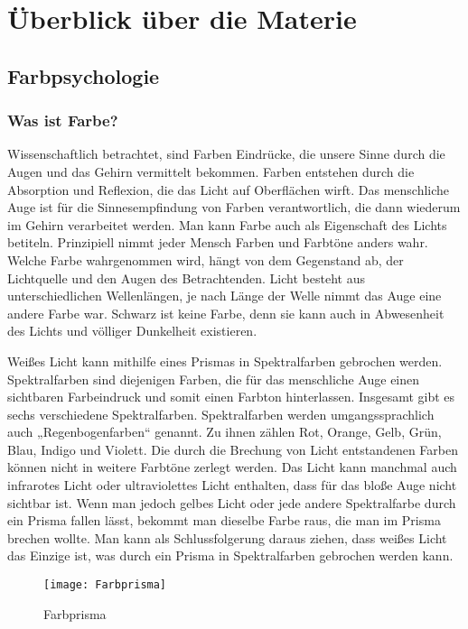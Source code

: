 \chapter{Überblick über die Materie}

\section{Farbpsychologie}

\subsection{Was ist Farbe?}
Wissenschaftlich betrachtet, sind Farben Eindrücke, die unsere Sinne durch die Augen und das Gehirn vermittelt bekommen. Farben entstehen durch die Absorption und Reflexion, die das Licht auf Oberflächen wirft. Das menschliche Auge ist für die Sinnesempfindung von Farben verantwortlich, die dann wiederum im Gehirn verarbeitet werden. Man kann Farbe auch als Eigenschaft des Lichts betiteln. Prinzipiell nimmt jeder Mensch Farben und Farbtöne anders wahr. Welche Farbe wahrgenommen wird, hängt von dem Gegenstand ab, der Lichtquelle und den Augen des Betrachtenden. Licht besteht aus unterschiedlichen Wellenlängen, je nach Länge der Welle nimmt das Auge eine andere Farbe war. Schwarz ist keine Farbe, denn sie kann auch in Abwesenheit des Lichts und völliger Dunkelheit existieren.
\cite{_special_subjects}
\cite{_leifi_physik}

Weißes Licht kann mithilfe eines Prismas in Spektralfarben gebrochen werden. Spektralfarben sind diejenigen Farben, die für das menschliche Auge einen sichtbaren Farbeindruck und somit einen Farbton hinterlassen. Insgesamt gibt es sechs verschiedene Spektralfarben. Spektralfarben werden umgangssprachlich auch „Regenbogenfarben“ genannt. Zu ihnen zählen Rot, Orange, Gelb, Grün, Blau, Indigo und Violett. Die durch die Brechung von Licht entstandenen Farben können nicht in weitere Farbtöne zerlegt werden. Das Licht kann manchmal auch infrarotes Licht oder ultraviolettes Licht enthalten, dass für das bloße Auge nicht sichtbar ist.
Wenn man jedoch gelbes Licht oder jede andere Spektralfarbe durch ein Prisma fallen lässt, bekommt man dieselbe Farbe raus, die man im Prisma brechen wollte. Man kann als Schlussfolgerung daraus ziehen, dass weißes Licht das Einzige ist, was durch ein Prisma in Spektralfarben gebrochen werden kann.
\cite{_special_subjects}
\cite{_leifi_physik}

\begin{figure}[H]
	\centering
	\texttt{[image: Farbprisma]}
	\caption{Farbprisma\cite{_special_subjects}}
\end{figure}

